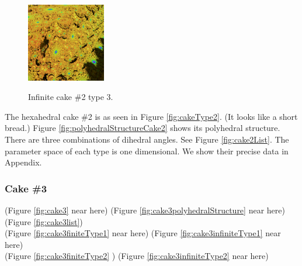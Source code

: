 \documentclass[suppldata, dvipdfmx]{interact}
\theoremstyle{plain}%
\theoremstyle{definition}
\theoremstyle{remark}
\theoremstyle{problemstyle}
\begin{document}
\begin{figure}[h!tbp]
\begin{minipage}{0.5\textwidth}
\begin{minipage}[t]{0.24\textwidth}
  \end{minipage}
  \hspace*{\fill}
  \begin{minipage}[t]{0.24\textwidth}
   \centering
   \includegraphics[width=1.35in, height=1.35in,
   keepaspectratio]{./img/sphairahedron/hexahedralCake2/limitsetInf_c.jpg} 
   \label{fig:cake2type3infiniteLimitset}
  \end{minipage}
  \hspace*{\fill}
  \caption{Infinite cake \#2 type 3.}
  \label{fig:cake2Type3infinite}
 \end{minipage}
\end{figure}

The hexahedral cake \#2 is as seen in Figure \ref{fig:cakeType2}.  
(It looks like a short bread.)
Figure \ref{fig:polyhedralStructureCake2} shows its polyhedral structure.  
There are three combinations of dihedral angles.  See Figure \ref{fig:cake2List}.
The parameter space of each type is one dimensional.  We show their precise data in Appendix.
\bigskip\par

\subsubsection{Cake \#3}

\noindent(Figure \ref{fig:cake3} near here)
(Figure \ref{fig:cake3polyhedralStructure} near here)\\
(Figure \ref{fig:cake3list})\\
(Figure \ref{fig:cake3finiteType1}
 near here)
(Figure \ref{fig:cake3infiniteType1}
 near here)\\
(Figure \ref{fig:cake3finiteType2}
)
(Figure \ref{fig:cake3infiniteType2}
 near here)
\end{document}
